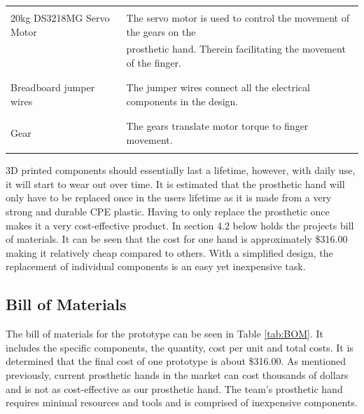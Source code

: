 \documentclass[11.5pt]{article}
\begin{document}
\begin{table}[H]
\begin{tabular}{|l|l|}
         & \\
        20kg DS3218MG Servo Motor &  The servo motor is used to control the movement of the gears on the \\ &  prosthetic hand. Therein facilitating the movement of the finger.\\ 
        & \\ \hline
        
         & \\
        Breadboard jumper wires & The jumper wires connect all the electrical components in the design.\\ 
        & \\ \hline
        
         & \\
        Gear & The gears translate motor torque to finger movement. \\ 
        & \\ \hline
    \end{tabular}
    \label{tab:Des}
\end{table}

3D printed components should essentially last a lifetime, however, with daily use, it will start to wear out over time. It is estimated that the prosthetic hand will only have to be replaced once in the users lifetime as it is made from a very strong and durable CPE plastic. Having to only replace the prosthetic once makes it a very cost-effective product. In section 4.2 below holds the projects bill of materials. It can be seen that the cost for one hand is approximately \$316.00 making it relatively cheap compared to others. With a simplified design, the replacement of individual components is an easy yet inexpensive task. \\

\newpage
\subsection{Bill of Materials}

The bill of materials for the prototype can be seen in Table \ref{tab:BOM}. It includes the specific components, the quantity, cost per unit and total costs. It is determined that the final cost of one prototype is about \$316.00. As mentioned previously, current prosthetic hands in the market can cost thousands of dollars and is not as cost-effective as our prosthetic hand. The team's prosthetic hand requires minimal resources and tools and is comprised of inexpensive components.\\
\end{document}
